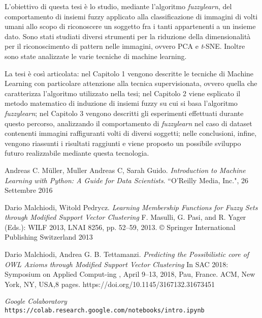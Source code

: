 \documentclass[12pt]{article}
\begin{document}
L'obiettivo di questa tesi è lo studio, mediante l'algoritmo \emph{fuzzylearn}, del comportamento di insiemi fuzzy applicato alla classificazione di immagini di volti umani allo scopo di riconoscere un soggetto fra i tanti appartenenti a un insieme dato. Sono stati studiati diversi strumenti per la riduzione della dimensionalità per il riconoscimento di pattern nelle immagini, ovvero PCA e \emph{t}-SNE. Inoltre sono state analizzate le varie tecniche di machine learning.

La tesi è così articolata: nel Capitolo 1 vengono descritte le tecniche di Machine Learning con particolare attenzione alla tecnica supervisionata, ovvero quella che caratterizza l'algoritmo utilizzato nella tesi; nel Capitolo 2 viene esplicato il metodo matematico di induzione di insiemi fuzzy su cui si basa l'algoritmo \emph{fuzzylearn}; nel Capitolo 3 vengono descritti gli esperimenti effettuati durante questo percorso, analizzando il comportamento di \emph{fuzzylearn} nel caso di dataset contenenti immagini raffiguranti volti di diversi soggetti; nelle conclusioni, infine, vengono riassunti i risultati raggiunti e viene proposto un possibile sviluppo futuro realizzabile mediante questa tecnologia.

\begin{thebibliography}{9}
	Andreas C. Müller, Muller Andreas C, Sarah Guido. 
	\textit{Introduction to Machine Learning with Python: A Guide for Data Scientists}. 
	``O'Reilly Media, Inc.", 26 Settembre 2016
	
	Dario Malchiodi, Witold Pedrycz.
	\textit{Learning Membership Functions for Fuzzy Sets
		through Modified Support Vector Clustering}
	F. Masulli, G. Pasi, and R. Yager (Eds.): WILF 2013, LNAI 8256, pp. 52–59, 2013.
	© Springer International Publishing Switzerland 2013
	
	Dario Malchiodi, Andrea G. B. Tettamanzi.
	\textit{Predicting the Possibilistic core of OWL Axioms through Modified Support Vector Clustering}
	In SAC 2018: Symposium on Applied Comput-ing , April 9–13, 2018, Pau, France. ACM, New York, NY, USA,8 pages. https://doi.org/10.1145/3167132.31673451
	
	\textit{Google Colaboratory}
	\\\texttt{https://colab.research.google.com/notebooks/intro.ipynb}
\end{thebibliography}
\end{document}
